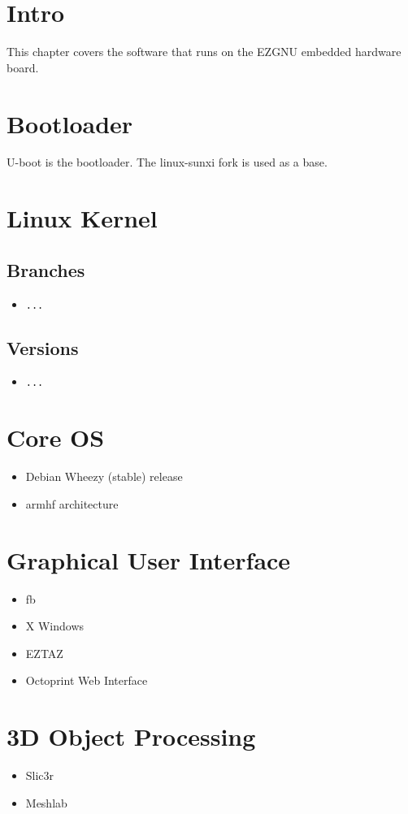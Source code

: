 %
%
%
%
%
\section{Intro}
This chapter covers the software that runs on the EZGNU embedded hardware board.


\section{Bootloader}
U-boot is the bootloader. The linux-sunxi fork is used as a base.


\section{Linux Kernel}

\subsection{Branches}
\begin{itemize}
  \item \texttt{...}
\end{itemize}

\subsection{Versions}
\begin{itemize}
  \item \texttt{...}
\end{itemize}


\section{Core OS}
\begin{itemize}
  \item{Debian Wheezy (stable) release}
  \item{armhf architecture}
\end{itemize}


\section{Graphical User Interface}

\begin{itemize}
  \item{fb}
  \item{X Windows}
  \item{EZTAZ}
  \item{Octoprint Web Interface}
\end{itemize}

\section{3D Object Processing}

\begin{itemize}
  \item{Slic3r}
  \item{Meshlab}
\end{itemize}


